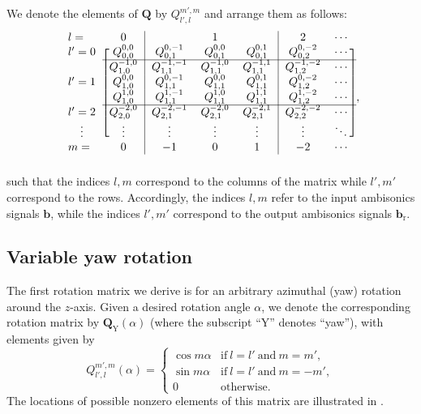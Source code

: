 We denote the elements of $\mathbf{Q}$ by $Q_{l',l}^{m',m}$ and arrange them as follows:
\begin{equation}\label{eq:A1_Navigation_Filters:Rotation_Matrix}
    \begin{blockarray}{lc|ccc|cc}
    l = & 0 & & 1 & & 2 & \cdots \\
    \begin{block}{c[c|ccc|cc]}
    l' = 0 & Q_{0,0}^{0,0} & Q_{0,1}^{0,-1} & Q_{0,1}^{0,0} & Q_{0,1}^{0,1} & Q_{0,2}^{0,-2} & \cdots \\ \cline{2-7}
     & Q_{1,0}^{-1,0} & Q_{1,1}^{-1,-1} & Q_{1,1}^{-1,0} & Q_{1,1}^{-1,1} & Q_{1,2}^{-1,-2} & \cdots \\
    l' = 1 & Q_{1,0}^{0,0} & Q_{1,1}^{0,-1} & Q_{1,1}^{0,0} & Q_{1,1}^{0,1} & Q_{1,2}^{0,-2} & \cdots \\
     & Q_{1,0}^{1,0} & Q_{1,1}^{1,-1} & Q_{1,1}^{1,0} & Q_{1,1}^{1,1} & Q_{1,2}^{1,-2} & \cdots \\ \cline{2-7}
    l' = 2 & Q_{2,0}^{-2,0} & Q_{2,1}^{-2,-1} & Q_{2,1}^{-2,0} & Q_{2,1}^{-2,1} & Q_{2,2}^{-2,-2} & \cdots \\
    \vdots & \vdots & \vdots & \vdots & \vdots & \vdots & \ddots \\
    \end{block}
    m = & 0 & -1 & 0 & 1 & -2 & \cdots \\
    \end{blockarray},
\end{equation}
such that the indices $l,m$ correspond to the columns of the matrix while $l',m'$ correspond to the rows.
Accordingly, the indices $l,m$ refer to the input ambisonics signals $\mathbf{b}$, while the indices $l',m'$ correspond to the output ambisonics signals $\mathbf{b}_\text{r}$.

\subsection{Variable yaw rotation}
The first rotation matrix we derive is for an arbitrary azimuthal (yaw) rotation around the $z$-axis.
Given a desired rotation angle $\alpha$, we denote the corresponding rotation matrix by $\mathbf{Q}_\text{Y}(\alpha)$ (where the subscript ``$\text{Y}$'' denotes ``yaw''), with elements given by \citep[Eq.~(3.12)]{Kronlachner2014b}
\begin{equation}\label{eq:A1_Navigation_Filters:Variable_Yaw}
Q_{l',l}^{m',m}(\alpha) = 
\begin{cases}
\cos m \alpha & \text{if}~ l=l' ~\text{and}~ m=m',\\
\sin m \alpha & \text{if}~ l=l' ~\text{and}~ m=-m',\\
0 & \text{otherwise}.
\end{cases}
\end{equation} %
The locations of possible nonzero elements of this matrix are illustrated in .

